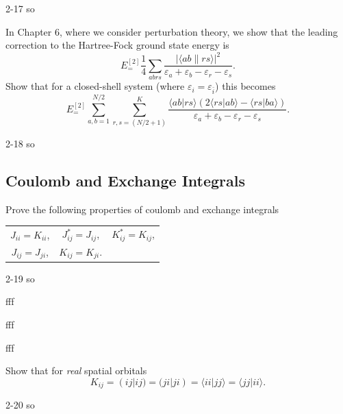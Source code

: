 \documentclass[a4paper]{book}
\newcommand\lr[2]{\langle#1\|#2\rangle}
\begin{document}
	\begin{solution}
		2-17 so
	\end{solution}
	
	\begin{exercise}
	In Chapter 6, where we consider perturbation theory, we show that the leading correction to the Hartree-Fock ground state energy is
	\[
		E^{[2]}_= \frac{1}{4} \sum_{abrs} \frac{ | \lr{ab}{rs} |^2 }{ \varepsilon_a + \varepsilon_b - \varepsilon_r - \varepsilon_s }.
	\]
	Show that for a closed-shell system (where $\varepsilon_i = \varepsilon_{\bar{i}}$) this becomes
	\[
		E^{[2]}_= \sum_{a,b=1}^{N/2} \sum_{r,s=(N/2+1)}^K \frac{ \langle ab|rs \rangle ( 2\langle rs | ab \rangle - \langle rs | ba \rangle ) }{ \varepsilon_a + \varepsilon_b - \varepsilon_r - \varepsilon_s }.
	\]
	\end{exercise}
	
	\begin{solution}
		2-18 so
	\end{solution}
	
	\subsection{Coulomb and Exchange Integrals}

	\begin{exercise}
	Prove the following properties of coulomb and exchange integrals
	\begin{center}
	\begin{tabular}{ccc}
		$J_{ii} = K_{ii}$, & $J^*_{ij} = J_{ij}$, &  $K^*_{ij} = K_{ij}$, \\
		$J_{ij} = J_{ji}$, & $K_{ij} = K_{ji}$.
	\end{tabular}
	\end{center}
	\end{exercise}
	
	\begin{solution}
		2-19 so
		
		fff
		
		fff
		
		
		fff
	\end{solution}
	
	\begin{exercise}
	Show that for {\it real} spatial orbitals
	\[
		K_{ij} = (ij|ij) = (ji|ji) = \langle ii | jj \rangle = \langle jj | ii \rangle.
	\]
	\end{exercise}
	
	\begin{solution}
		2-20 so
	\end{solution}
	
\end{document}
